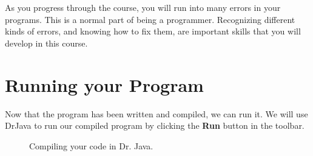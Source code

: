 
As you progress through the course, you will run into many errors in your programs. This is a normal part of being a programmer. Recognizing different kinds of errors, and knowing how to fix them, are important skills that you will develop in this course.

\section{Running your Program}

Now that the program has been written and compiled, we can run it. We will use DrJava to run our compiled program by clicking the \textbf{Run} button in the toolbar. 

\begin{figure}[ht]
	\centering
	\caption{Compiling your code in Dr. Java.}
	\label{fig:drjava_compiling}
\end{figure}

